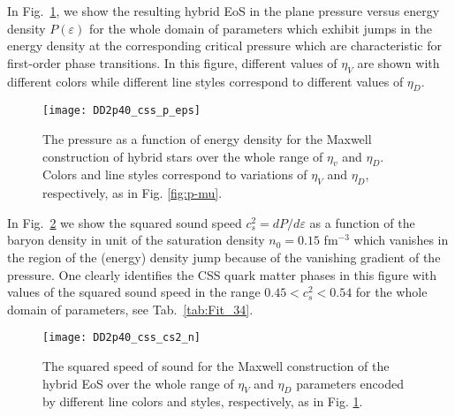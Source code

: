 \documentclass[%
 reprint,
superscriptaddress,
nofootinbib,
 amsmath,amssymb,
 aps,
]{revtex4-1}
\begin{document}
{In Fig.~\ref{fig:p-e}, we show the resulting hybrid EoS in the 
plane pressure versus energy density $P(\varepsilon)$ for the whole domain of parameters which exhibit jumps in the energy density at the corresponding critical pressure which are characteristic for first-order phase transitions. In this figure, different values of $\eta_V$ are shown with different colors while different line styles correspond to different values of $\eta_D$.}

\begin{figure}[thb]
    \texttt{[image: DD2p40\_css\_p\_eps]}
    \caption{The pressure as a function of energy density for the Maxwell construction of hybrid stars over the whole range of $\eta_v$ and $\eta_D$. Colors and line styles correspond to variations of $\eta_V$ and $\eta_D$, respectively, as in Fig. \ref{fig:p-mu}.}
    \label{fig:p-e}
\end{figure}


In Fig.~\ref{fig:cs2-n} we show the squared sound speed
$c_s^2=dP/d\varepsilon$ as a function of the baryon density 
in unit of the saturation density $n_0=0.15$ fm$^{-3}$ which 
vanishes in the region of the (energy) density jump because of the vanishing gradient of the pressure.
One clearly identifies the CSS quark matter phases in this figure with values of the squared sound speed in the range
$0.45 < c_s^2 < 0.54$ for the whole domain of parameters, see Tab.~\ref{tab:Fit_34}.
\begin{figure}[htb]
    \texttt{[image: DD2p40\_css\_cs2\_n]}
    \caption{The squared speed of sound for the Maxwell construction of the hybrid EoS over the whole range of $\eta_V$ and $\eta_D$ parameters encoded by different line colors and styles, respectively, as in 
    Fig. \ref{fig:p-e}.}
    \label{fig:cs2-n}
\end{figure}
\end{document}

